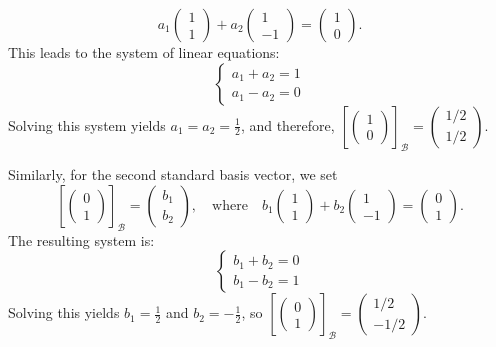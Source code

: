 \begin{example}
\[
a_1 \begin{pmatrix} 1 \\ 1 \end{pmatrix} + a_2 \begin{pmatrix} 1 \\ -1 \end{pmatrix} = \begin{pmatrix} 1 \\ 0 \end{pmatrix}.
\]
This leads to the system of linear equations:
\[
\begin{cases}
a_1 + a_2 = 1 \\
a_1 - a_2 = 0
\end{cases}
\]
Solving this system yields $a_1 = a_2 = \frac{1}{2}$, and therefore, $\left[\left(\begin{smallmatrix} 1 \\ 0 \end{smallmatrix}\right)\right]_{\mathcal{B}} = \left(\begin{smallmatrix} 1/2 \\ 1/2 \end{smallmatrix}\right)$.

Similarly, for the second standard basis vector, we set
\[
\left[\begin{pmatrix} 0 \\ 1 \end{pmatrix}\right]_{\mathcal{B}} = \begin{pmatrix} b_1 \\ b_2 \end{pmatrix}, \quad \text{where} \quad b_1 \begin{pmatrix} 1 \\ 1 \end{pmatrix} + b_2 \begin{pmatrix} 1 \\ -1 \end{pmatrix} = \begin{pmatrix} 0 \\ 1 \end{pmatrix}.
\]
The resulting system is:
\[
\begin{cases}
b_1 + b_2 = 0 \\
b_1 - b_2 = 1
\end{cases}
\]
Solving this yields $b_1 = \frac{1}{2}$ and $b_2 = -\frac{1}{2}$, so $\left[\left(\begin{smallmatrix} 0 \\ 1 \end{smallmatrix}\right)\right]_{\mathcal{B}} = \left(\begin{smallmatrix} 1/2 \\ -1/2 \end{smallmatrix}\right)$.


\end{example}
